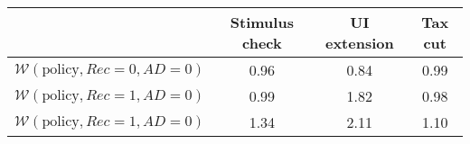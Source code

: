 \begin{tabular}{@{}lccc@{}} 
\toprule 
                          & Stimulus check      & UI extension    & Tax cut    \\  \midrule 
$\mathcal{W}(\text{policy}, Rec=0, AD=0)$ & 0.96  & 0.84  & 0.99     \\ 
$\mathcal{W}(\text{policy}, Rec=1, AD=0)$ & 0.99  & 1.82  & 0.98     \\ 
$\mathcal{W}(\text{policy}, Rec=1, AD=0)$ & 1.34  & 2.11  & 1.10     \\ 
\end{tabular}  
